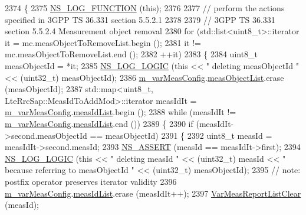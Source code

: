 \begin{DoxyCode}
2374 \{
2375   \hyperlink{log-macros-disabled_8h_a90b90d5bad1f39cb1b64923ea94c0761}{NS\_LOG\_FUNCTION} (\textcolor{keyword}{this});
2376 
2377   \textcolor{comment}{// perform the actions specified in 3GPP TS 36.331 section 5.5.2.1 }
2378 
2379   \textcolor{comment}{// 3GPP TS 36.331 section 5.5.2.4 Measurement object removal}
2380   \textcolor{keywordflow}{for} (std::list<uint8\_t>::iterator it = mc.measObjectToRemoveList.begin ();
2381        it !=  mc.measObjectToRemoveList.end ();
2382        ++it)
2383     \{
2384       uint8\_t measObjectId = *it;
2385       \hyperlink{group__logging_ga88acd260151caf2db9c0fc84997f45ce}{NS\_LOG\_LOGIC} (\textcolor{keyword}{this} << \textcolor{stringliteral}{" deleting measObjectId "} << (uint32\_t)  measObjectId);
2386       \hyperlink{classns3_1_1LteUeRrc_a27a7773eedfdab964d2514d9eeb1c562}{m\_varMeasConfig}.\hyperlink{structns3_1_1LteUeRrc_1_1VarMeasConfig_a79928885aabfe13a4d88e5d31233fac3}{measObjectList}.erase (measObjectId);
2387       std::map<uint8\_t, LteRrcSap::MeasIdToAddMod>::iterator measIdIt = 
      \hyperlink{classns3_1_1LteUeRrc_a27a7773eedfdab964d2514d9eeb1c562}{m\_varMeasConfig}.\hyperlink{structns3_1_1LteUeRrc_1_1VarMeasConfig_aa7ad91f943892cec48ffa9a5ae872e8c}{measIdList}.begin ();
2388       \textcolor{keywordflow}{while} (measIdIt != \hyperlink{classns3_1_1LteUeRrc_a27a7773eedfdab964d2514d9eeb1c562}{m\_varMeasConfig}.\hyperlink{structns3_1_1LteUeRrc_1_1VarMeasConfig_aa7ad91f943892cec48ffa9a5ae872e8c}{measIdList}.end ())
2389         \{
2390           \textcolor{keywordflow}{if} (measIdIt->second.measObjectId == measObjectId)
2391             \{
2392               uint8\_t measId = measIdIt->second.measId;
2393               \hyperlink{assert_8h_a6dccdb0de9b252f60088ce281c49d052}{NS\_ASSERT} (measId == measIdIt->first);
2394               \hyperlink{group__logging_ga88acd260151caf2db9c0fc84997f45ce}{NS\_LOG\_LOGIC} (\textcolor{keyword}{this} << \textcolor{stringliteral}{" deleting measId "} << (uint32\_t) measId << \textcolor{stringliteral}{" because
       referring to measObjectId "} << (uint32\_t)  measObjectId);
2395               \textcolor{comment}{// note: postfix operator preserves iterator validity}
2396               \hyperlink{classns3_1_1LteUeRrc_a27a7773eedfdab964d2514d9eeb1c562}{m\_varMeasConfig}.\hyperlink{structns3_1_1LteUeRrc_1_1VarMeasConfig_aa7ad91f943892cec48ffa9a5ae872e8c}{measIdList}.erase (measIdIt++);
2397               \hyperlink{classns3_1_1LteUeRrc_aa1a5d20a96dec717502ccf0030921f53}{VarMeasReportListClear} (measId);

\end{DoxyCode}
